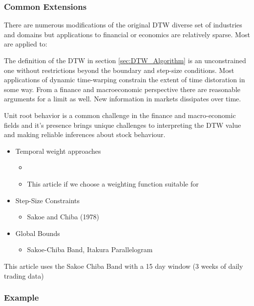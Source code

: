 \documentclass[12pt]{article}
\begin{document}
\subsubsection{Common Extensions}

There are numerous modifications of the original DTW diverse set of industries and domains but applications to financial or economics are relatively sparse. Most are applied to:


The definition of the DTW in section \ref{sec:DTW_Algorithm} is an unconstrained one without restrictions beyond the boundary and step-size conditions. Most applications of dynamic time-warping constrain the extent of time distoration in some way. From a finance and macroeconomic perspective there are reasonable arguments for a limit as well. New information in markets dissipates over time.

Unit root behavior is a common challenge in the finance and macro-economic fields and it's presence brings unique challenges to interpreting the DTW value and making reliable inferences about stock behaviour. 

\begin{itemize}
    \item Temporal weight approaches
        \begin{itemize}
            \item \parencite{JEONG20112231}
            \item This article if we choose a weighting function suitable for 
        \end{itemize}
    \item Step-Size Constraints
        \begin{itemize}
            \item Sakoe and Chiba (1978)
        \end{itemize}
    \item Global Bounds
        \begin{itemize}
            \item Sakoe-Chiba Band, Itakura Parallelogram
        \end{itemize}
\end{itemize}

This article uses the Sakoe Chiba Band with a 15 day window (3 weeks of daily trading data)

\subsubsection{Example}
\end{document}
